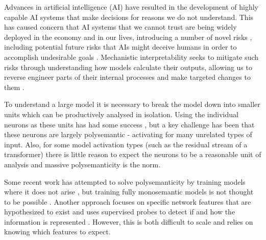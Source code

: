


Advances in artificial intelligence (AI) have resulted in the development of highly capable AI systems that make decisions for reasons we do not understand. This has caused concern that AI systems that we cannot trust are being widely deployed in the economy and in our lives, introducing a number of novel risks \citep{hendrycks2023overview}, including potential future risks that AIs might deceive humans in order to accomplish undesirable goals \citep{ngo2023alignment}. Mechanistic interpretability seeks to mitigate such risks through understanding how models calculate their outputs, allowing us to reverse engineer parts of their internal processes and make targeted changes to them \citep{christiano2021alignment, burns2022discovering, elhage2021mathematical}.

To understand a large model it is necessary to break the model down into smaller units which can be productively analysed in isolation. Using the individual neurons as these units has had some success \citep{olah2020zoom, bills2023language}, but a key challenge has been that these neurons are largely polysemantic - activating for many unrelated types of input. Also, for some model activation types (such as the residual stream of a transformer) there is little reason to expect the neurons to be a reasonable unit of analysis and massive polysemanticity is the norm.

Some recent work has attempted to solve polysemanticity by training models where it does not arise \citep{elhage2022solu}, but training fully monosemantic models is not thought to be possible \citep{anthropic2023}. Another approach focuses on specific network features that are hypothesized to exist and uses supervised probes to detect if and how the information is represented \citep{gurnee2023finding}. However, this is both difficult to scale and relies on knowing which features to expect.

